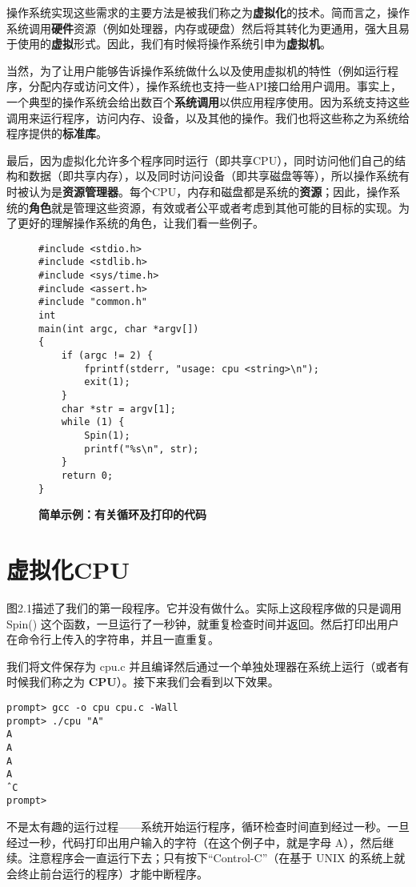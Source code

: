 操作系统实现这些需求的主要方法是被我们称之为\textbf{虚拟化}的技术。简而言之，操作系统调用\textbf{硬件}资源（例如处理器，内存或硬盘）然后将其转化为更通用，强大且易于使用的\textbf{虚拟}形式。因此，我们有时候将操作系统引申为\textbf{虚拟机}。

当然，为了让用户能够告诉操作系统做什么以及使用虚拟机的特性（例如运行程序，分配内存或访问文件），操作系统也支持一些API接口给用户调用。事实上，一个典型的操作系统会给出数百个\textbf{系统调用}以供应用程序使用。因为系统支持这些调用来运行程序，访问内存、设备，以及其他的操作。我们也将这些称之为系统给程序提供的\textbf{标准库}。

最后，因为虚拟化允许多个程序同时运行（即共享CPU），同时访问他们自己的结构和数据（即共享内存），以及同时访问设备（即共享磁盘等等），所以操作系统有时被认为是\textbf{资源管理器}。每个CPU，内存和磁盘都是系统的\textbf{资源}；因此，操作系统的\textbf{角色}就是管理这些资源，有效或者公平或者考虑到其他可能的目标的实现。为了更好的理解操作系统的角色，让我们看一些例子。

\newpage

\begin{figure}[ht]
\begin{lstlisting}  
#include <stdio.h> 
#include <stdlib.h> 
#include <sys/time.h> 
#include <assert.h> 
#include "common.h"
int
main(int argc, char *argv[])
{
    if (argc != 2) {
        fprintf(stderr, "usage: cpu <string>\n");
        exit(1);
    }
    char *str = argv[1];
    while (1) {
        Spin(1);
        printf("%s\n", str);
    }
    return 0;
}
\end{lstlisting}
\caption{\textbf{简单示例：有关循环及打印的代码}}
\end{figure}

\section{虚拟化CPU}
    
图2.1描述了我们的第一段程序。它并没有做什么。实际上这段程序做的只是调用 Spin() 这个函数，一旦运行了一秒钟，就重复检查时间并返回。然后打印出用户在命令行上传入的字符串，并且一直重复。

我们将文件保存为 cpu.c 并且编译然后通过一个单独处理器在系统上运行（或者有时候我们称之为 \textbf{CPU}）。接下来我们会看到以下效果。

\begin{verbatim}
prompt> gcc -o cpu cpu.c -Wall
prompt> ./cpu "A"
A
A
A
A
ˆC
prompt>
\end{verbatim}

不是太有趣的运行过程——系统开始运行程序，循环检查时间直到经过一秒。一旦经过一秒，代码打印出用户输入的字符（在这个例子中，就是字母 A），然后继续。注意程序会一直运行下去；只有按下“Control-C”（在基于 UNIX 的系统上就会终止前台运行的程序）才能中断程序。

